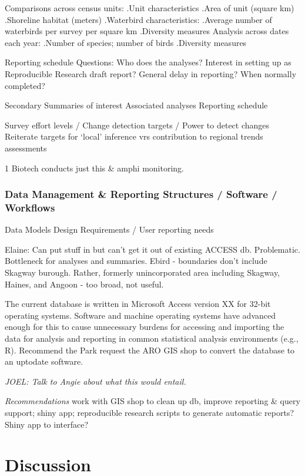 \documentclass[]{article}
\begin{document}
Comparisons across census units: .Unit characteristics .Area of unit
(square km) .Shoreline habitat (meters) .Waterbird characteristics:
.Average number of waterbirds per survey per square km .Diversity
measures Analysis across dates each year: .Number of species; number of
birds .Diversity measures

Reporting schedule Questions: Who does the analyses? Interest in setting
up as Reproducible Research draft report? General delay in reporting?
When normally completed?

Secondary Summaries of interest Associated analyses Reporting schedule

Survey effort levels / Change detection targets / Power to detect
changes Reiterate targets for `local' inference vrs contribution to
regional trends assessments

1 Biotech conducts just this \& amphi monitoring.

\subsubsection{Data Management \& Reporting Structures / Software /
Workflows}\label{data-management-reporting-structures-software-workflows}

Data Models Design Requirements / User reporting needs

Elaine: Can put stuff in but can't get it out of existing ACCESS db.
Problematic. Bottleneck for analyses and summaries. Ebird - boundaries
don't include Skagway burough. Rather, formerly unincorporated area
including Skagway, Haines, and Angoon - too broad, not useful.

The current database is written in Microsoft Access version XX for
32-bit operating systems. Software and machine operating systems have
advanced enough for this to cause unnecessary burdens for accessing and
importing the data for analysis and reporting in common statistical
analysis environments (e.g., R). Recommend the Park request the ARO GIS
shop to convert the database to an uptodate software.

\emph{JOEL: Talk to Angie about what this would entail.}

\emph{Recommendations} work with GIS shop to clean up db, improve
reporting \& query support; shiny app; reproducible research scripts to
generate automatic reports? Shiny app to interface?

\section{Discussion}\label{discussion}
\end{document}
